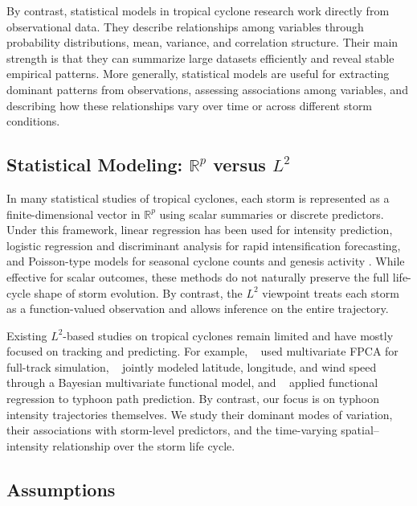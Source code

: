 \documentclass{article}
\begin{document}
By contrast, statistical models in tropical cyclone research work directly from observational data. They describe relationships among variables through probability distributions, mean, variance, and correlation structure. Their main strength is that they can summarize large datasets efficiently and reveal stable empirical patterns. More generally, statistical models are useful for extracting dominant patterns from observations, assessing associations among variables, and describing how these relationships vary over time or across different storm conditions.

\subsection{Statistical Modeling: $\mathbb{R}^p$ versus $L^2$}

In many statistical studies of tropical cyclones, each storm is represented as a finite-dimensional vector in $\mathbb{R}^p$ using scalar summaries or discrete predictors. Under this framework, linear regression has been used for intensity prediction, logistic regression and discriminant analysis for rapid intensification forecasting, and Poisson-type models for seasonal cyclone counts and genesis activity \cite{Lee2015MLR,Knaff2017Eye,Lu2010Taiwan,Tippett2011Poisson}. While effective for scalar outcomes, these methods do not naturally preserve the full life-cycle shape of storm evolution. By contrast, the $L^2$ viewpoint treats each storm as a function-valued observation and allows inference on the entire trajectory.

Existing $L^2$-based studies on tropical cyclones remain limited and have mostly focused on tracking and predicting. For example, ~\cite{Yang2021MFPCA} used multivariate FPCA for full-track simulation, ~\cite{Rekabdarkolaee2019Bayesian} jointly modeled latitude, longitude, and wind speed through a Bayesian multivariate functional model, and ~\cite{Kim2025FDAPath} applied functional regression to typhoon path prediction. By contrast, our focus is on typhoon intensity trajectories themselves. We study their dominant modes of variation, their associations with storm-level predictors, and the time-varying spatial--intensity relationship over the storm life cycle.

\subsection{Assumptions}
\end{document}
